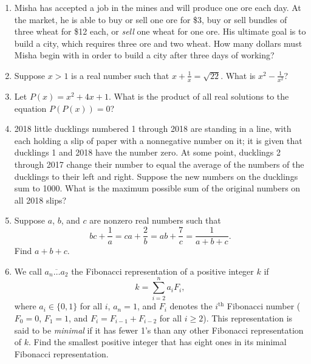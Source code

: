 \documentclass[10pt]{article}
\begin{document}
\begin{enumerate}

\item Misha has accepted a job in the mines and will produce one ore each day. At the market, he is able to buy or sell one ore for \$3, buy or sell bundles of three wheat for \$12 each, or \textit{sell} one wheat for one ore. His ultimate goal is to build a city, which requires three ore and two wheat. How many dollars must Misha begin with in order to build a city after three days of working?


\item Suppose $x>1$ is a real number such that $x+\tfrac 1x = \sqrt{22}$.  What is $x^2-\tfrac1{x^2}$?

\item Let $P(x)=x^2+4x+1$.  What is the product of all real solutions to the equation $P(P(x))=0$?


\item 2018 little ducklings numbered 1 through 2018 are standing in a line, with each holding a slip of paper with a nonnegative number on it; it is given that ducklings 1 and 2018 have the number zero.  At some point, ducklings 2 through 2017 change their number to equal the average of the numbers of the ducklings to their left and right.  Suppose the new numbers on the ducklings sum to 1000.  What is the maximum possible sum of the original numbers on all 2018 slips?

\item Suppose $a$, $b$, and $c$ are nonzero real numbers such that \[bc+\frac1a = ca+\frac2b = ab+\frac7c = \frac1{a+b+c}.\] Find $a+b+c$.

\item We call $\overline{a_n\ldots a_2}$ the Fibonacci representation of a positive integer $k$ if \[k = \sum_{i=2}^n a_i F_i,\] where $a_i\in\{0,1\}$ for all $i$, $a_n=1$, and $F_i$ denotes the $i^{\text{th}}$ Fibonacci number ($F_0=0$, $F_1=1$, and $F_i=F_{i-1}+F_{i-2}$ for all $i\ge2$). This representation is said to be \textit{minimal} if it has fewer 1’s than any other Fibonacci representation of $k$. Find the smallest positive integer that has eight ones in its minimal Fibonacci representation. 


\end{enumerate}
\end{document}
